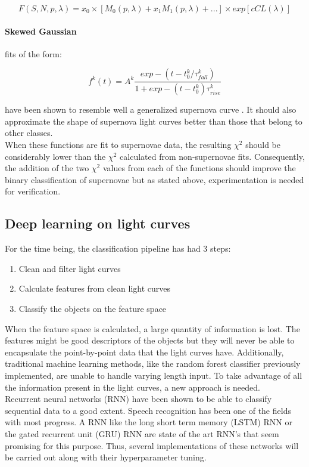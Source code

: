 \[
  F(S,N,p,\lambda) = x_0 \times [M_0(p,\lambda)+x_1M_1(p,\lambda)+...]\times exp[cCL(\lambda)]
\]

\paragraph{Skewed Gaussian} fits of the form:

\[f^k(t) = A^k \frac{exp-(t-t_0^k/\tau^k_{fall})}{1+exp-(t-t^k_0)\tau^k_{rise}}\]

have been shown to resemble well a generalized supernova curve \cite{sGaussian}. It should also approximate the shape of supernova light curves better than those that belong to other classes.\\

When these functions are fit to supernovae data, the resulting $\chi^2$ should be considerably lower than the $\chi^2$ calculated from non-supernovae fits. Consequently, the addition of the two $\chi^2$  values from each of the functions should improve the binary classification of supernovae but as stated above, experimentation is needed for verification.

\subsection{Deep learning on light curves}

For the time being, the classification pipeline has had 3 steps:

\begin{enumerate}
  \item Clean and filter light curves
  \item Calculate features from clean light curves
  \item Classify the objects on the feature space
\end{enumerate}

When the feature space is calculated, a large quantity of information is lost. The features might be good descriptors of the objects but they will never be able to encapsulate the point-by-point data that the light curves have. Additionally, traditional machine learning methods, like the random forest classifier previously implemented, are unable to handle varying length input. To take advantage of all the information present in the light curves, a new approach is needed.\\

Recurrent neural networks (RNN) have been shown to be able to classify sequential data to a good extent. Speech recognition has been one of the fields with most progress\cite{RNN}. A RNN like the long short term memory (LSTM) RNN or the gated recurrent unit (GRU) RNN are state of the art RNN's that seem promising for this purpose. Thus, several implementations of these networks will be carried out along with their hyperparameter tuning. 


